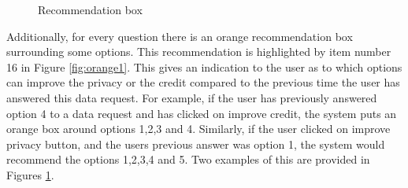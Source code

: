 \begin{figure}[htp]
  \hspace{1em}
  \caption{Recommendation box}
  \label{fig:orange}
\end{figure}

Additionally, for every question there is an orange recommendation box surrounding some options. This recommendation is highlighted by item number 16 in Figure \ref{fig:orange1}.
This gives an indication to the user as to which options can improve the privacy or the credit compared to the previous time the user has
answered this data request. For example, if the user has previously answered option 4 to a data request and has clicked on improve credit, the system
puts an orange box around options 1,2,3 and 4. Similarly, if the user clicked on improve privacy button, and the users previous answer was option 1, the system would recommend the options 1,2,3,4 and 5. Two examples of this are provided in Figures \ref{fig:orange}. 

